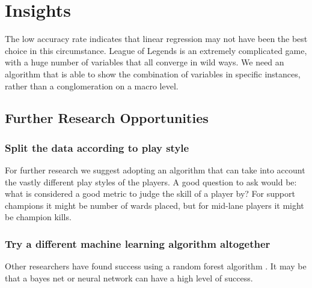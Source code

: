 \documentclass{article} %
\begin{document}
\section{Insights}
The low accuracy rate indicates that linear regression may not have been the best choice in this circumstance. League of Legends is an extremely complicated game, with a huge number of variables that all converge in wild ways. We need an algorithm that is able to show the combination of variables in specific instances, rather than a conglomeration on a macro level.

\subsection{Further Research Opportunities}
\subsubsection{Split the data according to play style}
For further research we suggest adopting an algorithm that can take into account the vastly different play styles of the players. A good question to ask would be: what is considered a good metric to judge the skill of a player by? For support champions it might be number of wards placed, but for mid-lane players it might be champion kills.
\subsubsection{Try a different machine learning algorithm altogether}
Other researchers have found success using a random forest algorithm \cite{patterson}. It may be that a bayes net or neural network can have a high level of success.
\end{document}
